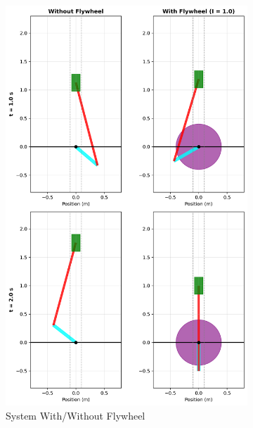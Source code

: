 \documentclass[10pt]{article}
\begin{document}
\begin{figure}[H]
    \centering
    \begin{subfigure}[b]{0.45\textwidth}
        \centering
        \includegraphics[width=\textwidth]{system_flywheel_comparison.png}
        \caption{System With/Without Flywheel}
    \end{subfigure}
    \hfill
    \begin{subfigure}[b]{0.45\textwidth}
        \centering

\end{subfigure}
\end{figure}
\end{document}
